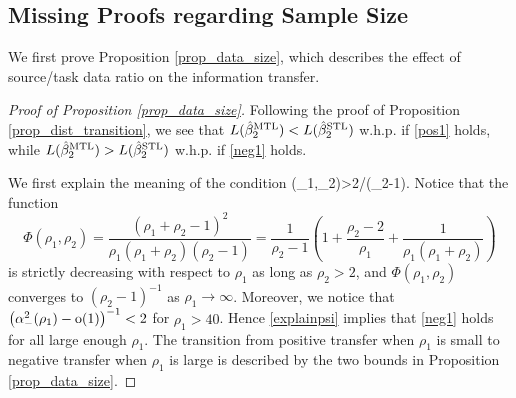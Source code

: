 \subsection{Missing Proofs regarding Sample Size} \label{app_proof_32}
We first prove Proposition \ref{prop_data_size}, which describes the effect of source/task data ratio on the information transfer. 

\begin{proof}[Proof of Proposition \ref{prop_data_size}]
Following the proof of Proposition \ref{prop_dist_transition}, we see that $L(\hat{\beta}_2^{\text{MTL}})< L(\hat{\beta}_2^{\text{STL}})$ w.h.p. if \eqref{pos1} holds, while $L(\hat{\beta}_2^{\text{MTL}})>L(\hat{\beta}_2^{\text{STL}})$ w.h.p. if \eqref{neg1} holds. 

We first explain the meaning of the condition 
\be\label{explainpsi}\Psi(\beta_1,\beta_2)>2/(\rho_2-1).\ee 
Notice that the function
$$ \Phi(\rho_1, \rho_2)=\frac{(\rho_1 + \rho_2 - 1)^2}{\rho_1 (\rho_1 + \rho_2) (\rho_2 - 1)}=\frac{1}{\rho_2-1} \left(1 +\frac{\rho_2-2}{\rho_1}+\frac{1}{\rho_1(\rho_1+\rho_2)}\right)$$
is strictly decreasing with respect to $\rho_1$ as long as $\rho_2> 2$, and $ \Phi(\rho_1, \rho_2)$ converges to $(\rho_2-1)^{-1}$ as $\rho_1\to \infty$.  Moreover, we notice that $\left( \alpha_-^2(\rho_1) -  \operatorname{o}(1) \right)^{-1} < 2$ for $\rho_1>40$. Hence \eqref{explainpsi} implies that \eqref{neg1} holds for all  large enough $\rho_1$. The transition from positive transfer when $\rho_1$ is small to negative transfer when $\rho_1$ is large is described by the two bounds in Proposition \ref{prop_data_size}.
 



\end{proof}
